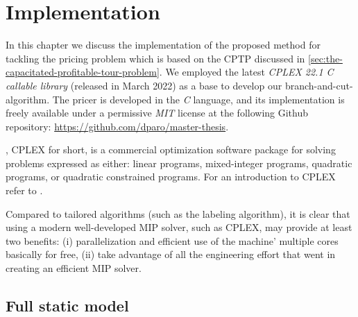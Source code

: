 \chapter{Implementation}

In this chapter we discuss the implementation of the proposed method
for tackling the pricing problem which is based on the CPTP
discussed in \cref{sec:the-capacitated-profitable-tour-problem}.
We employed the latest \textit{CPLEX 22.1 C callable library} (released in March 2022)
as a base
to develop our branch-and-cut-algorithm.
The pricer is developed in the \textit{C} language, and its implementation
is freely available under a permissive \textit{MIT} license
at the following Github repository: \url{https://github.com/dparo/master-thesis}.

\medskip

,
CPLEX for short,
is a commercial optimization software package for solving problems expressed as either:
linear programs, mixed-integer programs, quadratic programs, or quadratic constrained programs.
For an introduction to CPLEX refer to .

\medskip

Compared to tailored algorithms (such as the labeling algorithm),
it is clear that using a modern well-developed MIP solver, such as CPLEX,
may provide at least two benefits:
(i) parallelization and efficient use of the machine' multiple cores basically for free,
(ii) take advantage of all the engineering effort that went in creating an efficient MIP solver.

\section{Full static model}
\label{sec:impl-full-static-model}

